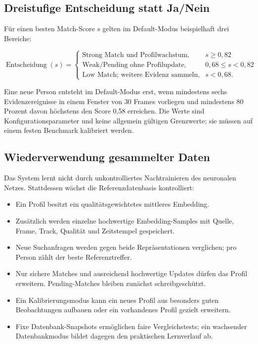 \subsection{Dreistufige Entscheidung statt Ja/Nein}

Für einen besten Match-Score $s$ gelten im Default-Modus beispielhaft drei
Bereiche:

\begin{equation}
  \operatorname{Entscheidung}(s)=
  \begin{cases}
    \text{Strong Match und Profilwachstum}, & s \geq 0{,}82 \\
    \text{Weak/Pending ohne Profilupdate}, & 0{,}68 \leq s < 0{,}82 \\
    \text{Low Match; weitere Evidenz sammeln}, & s < 0{,}68.
  \end{cases}
\end{equation}

Eine neue Person entsteht im Default-Modus erst, wenn mindestens sechs
Evidenzereignisse in einem Fenster von 30 Frames vorliegen und mindestens
80 Prozent davon höchstens den Score 0,58 erreichen. Die Werte sind
Konfigurationsparameter und keine allgemein gültigen Grenzwerte; sie müssen auf
einem festen Benchmark kalibriert werden.

\subsection{Wiederverwendung gesammelter Daten}

Das System lernt nicht durch unkontrolliertes Nachtrainieren des neuronalen
Netzes. Stattdessen wächst die Referenzdatenbasis kontrolliert:

\begin{itemize}[leftmargin=7mm]
  \item Ein Profil besitzt ein qualitätsgewichtetes mittleres Embedding.
  \item Zusätzlich werden einzelne hochwertige Embedding-Samples mit Quelle,
    Frame, Track, Qualität und Zeitstempel gespeichert.
  \item Neue Suchanfragen werden gegen beide Repräsentationen verglichen; pro
    Person zählt der beste Referenztreffer.
  \item Nur sichere Matches und ausreichend hochwertige Updates dürfen das
    Profil erweitern. Pending-Matches bleiben zunächst schreibgeschützt.
  \item Ein Kalibrierungsmodus kann ein neues Profil aus besonders guten
    Beobachtungen aufbauen oder ein vorhandenes Profil gezielt erweitern.
  \item Fixe Datenbank-Snapshots ermöglichen faire Vergleichstests; ein
    wachsender Datenbankmodus bildet dagegen den praktischen Lernverlauf ab.
\end{itemize}

